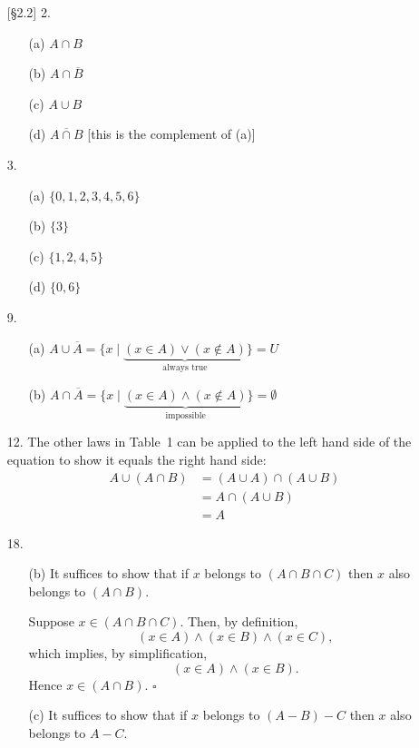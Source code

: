 \documentclass{article}
\begin{document}
\begin{enumerate}
    \item[{[\S 2.2]} 2.]
        \begin{itemize}
            \item[(a)] $A \cap B$
            \item[(b)] $A \cap \overline{B}$
            \item[(c)] $A \cup B$
            \item[(d)] $\overline{A \cap B}$ [this is the complement of (a)]
        \end{itemize}
    \item[3.]
        \begin{itemize}
            \item[(a)] $\{ 0,1,2,3,4,5,6 \}$
            \item[(b)] $\{ 3 \}$
            \item[(c)] $\{ 1,2,4,5 \}$
            \item[(d)] $\{ 0,6 \}$
        \end{itemize}
    \item[9.]
        \begin{itemize}
            \item[(a)] $A \cup \overline{A} = \{ x \mid \underbrace{(x \in A) \lor (x \notin A)}_{\textrm{always true}}\} = U$
            \item[(b)] $A \cap \overline{A} = \{ x \mid \underbrace{(x \in A) \land (x \notin A)}_{\textrm{impossible}} \} = \emptyset$
        \end{itemize}
    \item[12.] The other laws in Table~1 can be applied to the left hand side of the equation to show it equals the right hand side:
        \begin{align*}
        A \cup (A \cap B) &= (A \cup A) \cap (A \cup B) \tag*{distributive law} \\
        &= A \cap (A \cup B) \tag*{idempotent law} \\
        &= A \tag*{second absorption law}
        \end{align*}
    \item[18.]
        \begin{itemize}
            \item[(b)] It suffices to show that if $x$ belongs to $(A \cap B \cap C)$ then $x$ also belongs to $(A \cap B)$.

            Suppose $x \in (A \cap B \cap C)$. Then, by definition,
            \[
            (x \in A) \land (x \in B) \land (x \in C),
            \]
            which implies, by simplification,
            \[
            (x \in A) \land (x \in B).
            \]
            Hence $x \in (A \cap B)$. $\square$
            \item[(c)] It suffices to show that if $x$ belongs to $(A-B)-C$ then $x$ also belongs to $A-C$.


\end{itemize}
\end{enumerate}
\end{document}
